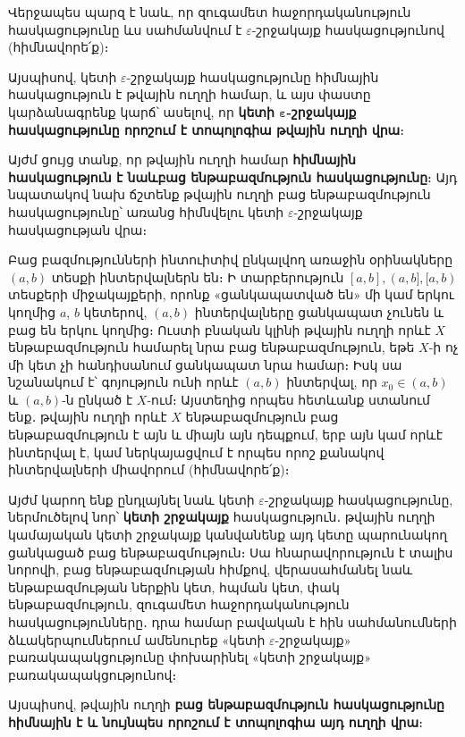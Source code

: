 \documentclass[./main.tex]{subfiles}
\begin{document}
Վերջապես պարզ է նաև, որ զուգամետ հաջորդականություն հասկացությունը ևս սահմանվում է $\varepsilon$-շրջակայք հասկացությունով (հիմնավորե՛ք)։

\par Այսպիսով, կետի $\varepsilon$-շրջակայք հասկացությունը հիմնային հասկացություն է թվա\-յին ուղղի համար, և այս փաստը կարձանագրենք կարճ՝ ասելով, որ \textbf{կետի $\boldsymbol{\varepsilon}$-շրջա\-կայք հասկացությունը որոշում է տոպոլոգիա թվային ուղղի վրա}։

\par Այժմ ցույց տանք, որ թվային ուղղի համար \textbf{հիմնային հասկացություն է նաև\linebreak բաց ենթաբազմություն հասկացությունը}։ Այդ նպատակով նախ ճշտենք թվային ուղղի բաց ենթաբազմություն հասկացությունը՝ առանց հիմնվելու կետի $\varepsilon$-շրջա\-կայք հաս\-կացության վրա։

\par Բաց բազմությունների ինտուիտիվ ընկալվող առաջին օրինակները $(a,b)$ տես\-քի ինտերվալներն են։ Ի տարբերություն $[a,b], (a,b], [a,b)$ տեսքերի միջակայքերի, որոնք «ցանկապատված են» մի կամ երկու կողմից $a$, $b$ կետերով, $(a,b)$ ինտերվալ\-նե\-րը ցանկապատ չունեն և բաց են երկու կողմից։ Ուստի բնական կլինի թվային ուղղի որևէ $X$ ենթաբազմություն համարել նրա բաց ենթաբազմություն, եթե $X$-ի ոչ մի կետ չի հանդիսանում ցանկապատ նրա համար։ Իսկ սա նշանակում է՝ գոյություն ունի որևէ $(a,b)$ ինտերվալ, որ $x_0 \in (a,b)$ և $(a,b)$-ն ընկած է $X$-ում։ Այստեղից որպես հետևանք ստանում ենք․ թվային ուղղի որևէ $X$ ենթաբազմություն բաց ենթաբազմություն է այն և միայն այն դեպքում, երբ այն կամ որևէ ինտերվալ է, կամ ներկայացվում է որպես որոշ քանակով ինտերվալների միավորում (հիմնավորե՛ք)։

\par Այժմ կարող ենք ընդլայնել նաև կետի $\varepsilon$-շրջակայք հասկացությունը, ներմու\-ծե\-լով նոր՝ \textbf{կետի շրջակայք} հասկացություն․ թվային ուղղի կամայական կետի շրջա\-կայք կանվանենք այդ կետը պարունակող ցանկացած բաց ենթաբազմություն։ Սա հնա\-րա\-վորություն է տալիս նորովի, բաց ենթաբազմության հիմքով, վերա\-սահ\-մանել նաև ենթաբազմության ներքին կետ, հպման կետ, փակ ենթաբազմություն, զուգա\-մետ հաջորդականություն հասկացությունները․ դրա համար բավական է հին սահ\-մա\-նում\-ների ձևակերպումներում ամենուրեք «կետի $\varepsilon$-շրջակայք» բառակապակցու\-թյունը փոխարինել «կետի շրջակայք» բառակապակցությունով։

\par Այսպիսով, թվային ուղղի \textbf{բաց ենթաբազմություն հասկացությունը հիմնային է և նույնպես որոշում է տոպոլոգիա այդ ուղղի վրա}։
\end{document}
